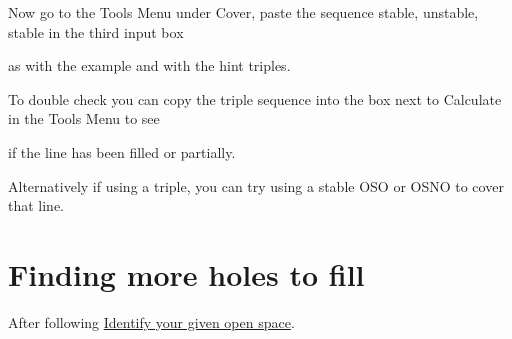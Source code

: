 \documentclass[11pt]{report}
\begin{document}
Now go to the Tools Menu under Cover, paste the sequence stable, unstable, stable in the third input box

as with the example and with the hint triples.

To double check you can copy the triple sequence into the box next to Calculate in the Tools Menu to see

if the line has been filled or partially.

Alternatively if using a triple, you can try using a stable OSO or OSNO to cover that line.

\section{Finding more holes to fill}\label{covers}
After following \hyperref[id]{Identify your given open space}. 
\end{document}

